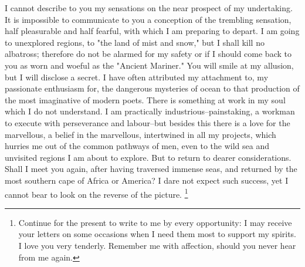 I cannot describe to you my sensations on the near prospect of my undertaking. It is impossible to communicate to you a conception of the trembling sensation, half pleasurable and half fearful, with which I am preparing to depart. I am going to unexplored regions, to "the land of mist and snow," but I shall kill no albatross; therefore do not be alarmed for my safety or if I should come back to you as worn and woeful as the "Ancient Mariner." You will smile at my allusion, but I will disclose a secret. I have often attributed my attachment to, my passionate enthusiasm for, the dangerous mysteries of ocean to that production of the most imaginative of modern poets. There is something at work in my soul which I do not understand. I am practically industrious--painstaking, a workman to execute with perseverance and labour--but besides this there is a love for the marvellous, a belief in the marvellous, intertwined in all my projects, which hurries me out of the common pathways of men, even to the wild sea and unvisited regions I am about to explore. But to return to dearer considerations. Shall I meet you again, after having traversed immense seas, and returned by the most southern cape of Africa or America? I dare not expect such success, yet I cannot bear to look on the reverse of the picture. \footnote{Continue for the present to write to me by every opportunity: I may receive your letters on some occasions when I need them most to support my spirits. I love you very tenderly. Remember me with affection, should you never hear from me again.}

